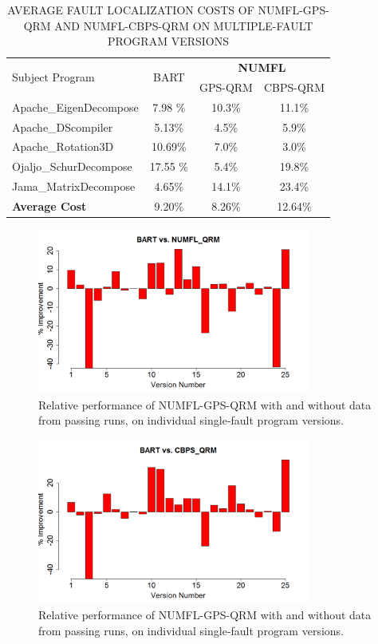 \begin{table}[htbp!]
\caption{AVERAGE FAULT LOCALIZATION COSTS OF NUMFL-GPS-QRM AND NUMFL-CBPS-QRM ON MULTIPLE-FAULT PROGRAM VERSIONS}
\label{table6}
\centering
      \begin{tabular}{|l|c|c|c|}
      \hline
\multirow{2}{*}{Subject Program}	& \multirow{2}{*}{BART}&	\multicolumn{2}{|c|}{{\bf NUMFL}}	\\	\cline{3-4}
& & GPS-QRM	&CBPS-QRM \\ \hline
Apache\_EigenDecompose	&7.98	\%&10.3\%	&	11.1\%	\\	\hline
Apache\_DScompiler	&	5.13\%&4.5\%	&	5.9\%	\\	\hline
Apache\_Rotation3D	&	10.69\%&7.0\%	&	3.0\%	\\	\hline
Ojaljo\_SchurDecompose	&17.55	\%&5.4\%	&	19.8\%	\\	\hline
Jama\_MatrixDecompose	&	4.65\%&14.1\%	&	23.4\%	\\	\hline
{\bf Average Cost} &9.20\% &8.26\% &12.64\%\\ \hline
\end{tabular}
\end{table}

\begin{figure}[!thpb]
\centering
\includegraphics[width=0.8\textwidth]{chapter4_BARTvsGPS_QRM_M.pdf}
\caption{Relative performance of NUMFL-GPS-QRM with and without data from passing runs, on individual single-fault program versions.}
\label{BARTvsGPS_M}
\end{figure}

\begin{figure}[!thpb]
\centering
\includegraphics[width=0.8\textwidth]{chapter4_BARTvsCBPS_M.pdf}
\caption{Relative performance of NUMFL-GPS-QRM with and without data from passing runs, on individual single-fault program versions.}
\label{BARTvsCBPS_M}
\end{figure}

